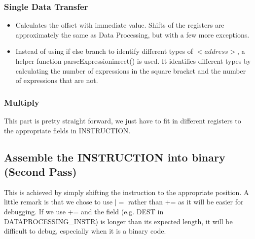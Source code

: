 \documentclass[11pt]{article}
\begin{document}
\subsubsection{Single Data Transfer}
\begin{itemize}  
\item Calculates the offset with immediate value. Shifts of the registers are approximately the same as Data Processing, but with a few more exceptions.

\item Instead of using if else branch to identify different types of $<address>$, a helper function parseExpressioninrect() is used. It identifies different types by calculating the number of expressions in the square bracket and the number of expressions that are not.
\end{itemize}

\subsubsection{Multiply}
This part is pretty straight forward, we just have to fit in different registers to the appropriate fields in INSTRUCTION.

\subsection{Assemble the INSTRUCTION into binary (Second Pass)}
This is achieved by simply shifting the instruction to the appropriate position. A little remark is that we chose to use $|=$ rather than += as it will be easier for debugging. If we use += and the field (e.g. DEST in DATAPROCESSING{\_}INSTR) is longer than its expected length, it will be difficult to debug, especially when it is a binary code.
\end{document}
